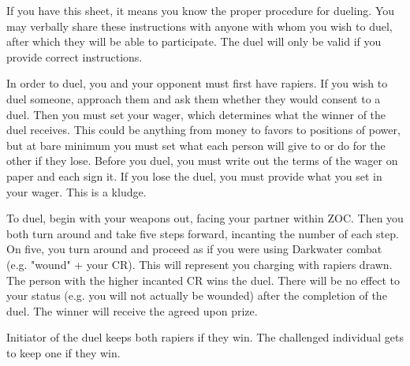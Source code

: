 \documentclass[green]{guildcamp4}
\begin{document}
\name{\gDuel{}}

If you have this sheet, it means you know the proper procedure for dueling. You may verbally share these instructions with anyone with whom you wish to duel, after which they will be able to participate. The duel will only be valid if you provide correct instructions.

In order to duel, you and your opponent must first have rapiers. If you wish to duel someone, approach them and ask them whether they would consent to a duel. Then you must set your wager, which determines what the winner of the duel receives. This could be anything from money to favors to positions of power, but at bare minimum you must set what each person will give to or do for the other if they lose. Before you duel, you must write out the terms of the wager on paper and each sign it. If you lose the duel, you must provide what you set in your wager. This is a kludge.

To duel, begin with your weapons out, facing your partner within ZOC. Then you both turn around and take five steps forward, incanting the number of each step. On five, you turn around and proceed as if you were using Darkwater combat (e.g. "wound" + your CR). This will represent you charging with rapiers drawn. The person with the higher incanted CR wins the duel. There will be no effect to your status (e.g. you will not actually be wounded) after the completion of the duel. The winner will receive the agreed upon prize.

Initiator of the duel keeps both rapiers if they win. The challenged individual gets to keep one if they win.
\end{document}
